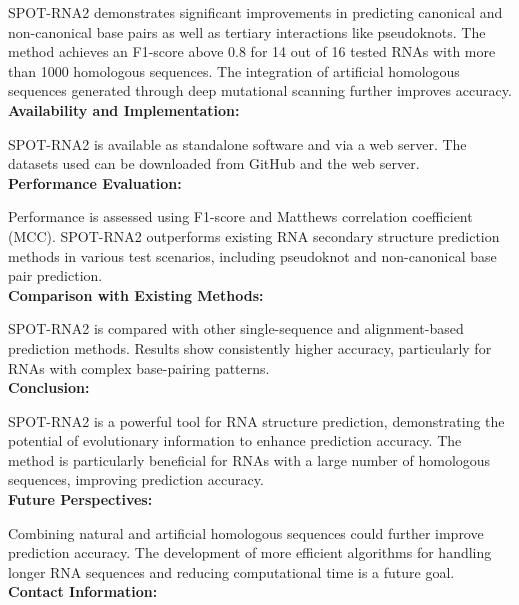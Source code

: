 \documentclass{article}
\begin{document}
\begin{large}
\begin{large}
\begin{large}
SPOT-RNA2 demonstrates significant improvements in predicting canonical and non-canonical base pairs as well as tertiary interactions like pseudoknots.
The method achieves an F1-score above 0.8 for 14 out of 16 tested RNAs with more than 1000 homologous sequences.
The integration of artificial homologous sequences generated through deep mutational scanning further improves accuracy. \\[0.5em]

\textbf{Availability and Implementation:}\par

SPOT-RNA2 is available as standalone software and via a web server.
The datasets used can be downloaded from GitHub and the web server.\\[0.5em]

\textbf{Performance Evaluation:}\par

Performance is assessed using F1-score and Matthews correlation coefficient (MCC).
SPOT-RNA2 outperforms existing RNA secondary structure prediction methods in various test scenarios, including pseudoknot and non-canonical base pair prediction.\\[0.5em]

\textbf{Comparison with Existing Methods:}\par

SPOT-RNA2 is compared with other single-sequence and alignment-based prediction methods.
Results show consistently higher accuracy, particularly for RNAs with complex base-pairing patterns.\\[0.5em]

\textbf{Conclusion:}\par

SPOT-RNA2 is a powerful tool for RNA structure prediction, demonstrating the potential of evolutionary information to enhance prediction accuracy.
The method is particularly beneficial for RNAs with a large number of homologous sequences, improving prediction accuracy.\\[0.5em]

\textbf{Future Perspectives:}\par

Combining natural and artificial homologous sequences could further improve prediction accuracy.
The development of more efficient algorithms for handling longer RNA sequences and reducing computational time is a future goal.\\[0.5em]

\textbf{Contact Information:}\par


\end{large}
\end{large}
\end{large}
\end{document}
